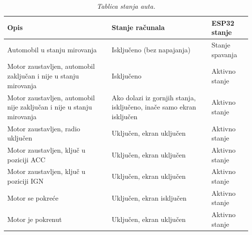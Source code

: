\begin{table}[H]
  \caption{\textit{Tablica stanja auta.}}
  \begin{tabularx}{\textwidth} { 
  | >{\raggedright\arraybackslash}X 
  | >{\raggedright\arraybackslash}X 
  | >{\raggedright\arraybackslash}X | }
    \hline
    \textbf{Opis} & \textbf{Stanje računala} & \textbf{ESP32 stanje} \\
    \hline
    \hline
    Automobil u stanju mirovanja & Isključeno (bez napajanja) & Stanje spavanja \\
    \hline
    Motor zaustavljen, automobil zaključan i nije u stanju mirovanja & Isključeno & Aktivno stanje \\
    \hline
    Motor zaustavljen, automobil nije zaključan i nije u stanju mirovanja & Ako dolazi iz gornjih stanja, isključeno, inače samo ekran isključen & Aktivno stanje \\
    \hline
    Motor zaustavljen, radio uključen & Uključen, ekran uključen & Aktivno stanje \\
    \hline
    Motor zaustavljen, ključ u poziciji ACC & Uključen, ekran uključen & Aktivno stanje \\
    \hline
    Motor zaustavljen, ključ u poziciji IGN & Uključen, ekran uključen & Aktivno stanje \\
    \hline
    Motor se pokreće & Uključen, ekran isključen & Aktivno stanje \\
    \hline
    Motor je pokrenut & Uključen, ekran uključen & Aktivno stanje \\
    \hline
  \end{tabularx}
  \label{tbl:car-states}
\end{table}
